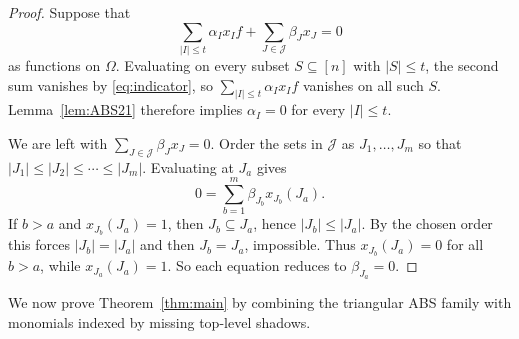 \documentclass[11pt]{article}
\theoremstyle{plain}
\theoremstyle{remark}
\newcommand{\abs}[1]{\left|#1\right|}
\begin{document}
\begin{proof}
Suppose that
$$
  \sum_{\abs{I}\le t}\alpha_I x_I f+\sum_{J\in\mathcal{J}}\beta_J x_J=0
$$
as functions on $\Omega$.
Evaluating on every subset $S\subseteq[n]$ with $\abs{S}\le t$, the second sum vanishes by
\eqref{eq:indicator}, so $\sum_{\abs{I}\le t}\alpha_I x_I f$ vanishes on all such $S$.
Lemma~\ref{lem:ABS21} therefore implies $\alpha_I=0$ for every $\abs{I}\le t$.

We are left with $\sum_{J\in\mathcal{J}}\beta_J x_J=0$.
Order the sets in $\mathcal{J}$ as $J_1,\dots,J_m$ so that
$\abs{J_1}\le\abs{J_2}\le\cdots\le\abs{J_m}$.
Evaluating at $J_a$ gives
$$
  0=\sum_{b=1}^{m}\beta_{J_b}x_{J_b}(J_a).
$$
If $b>a$ and $x_{J_b}(J_a)=1$, then $J_b\subseteq J_a$, hence $\abs{J_b}\le\abs{J_a}$.
By the chosen order this forces $\abs{J_b}=\abs{J_a}$ and then $J_b=J_a$, impossible.
Thus $x_{J_b}(J_a)=0$ for all $b>a$, while $x_{J_a}(J_a)=1$.
So each equation reduces to $\beta_{J_a}=0$.
\end{proof}
We now prove Theorem~\ref{thm:main} by combining the triangular ABS family with monomials indexed by
missing top-level shadows.
\end{document}
